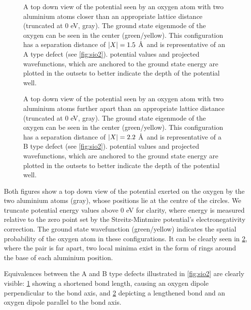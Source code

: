 \begin{figure}[htp]
\resizebox{\textwidth}{!}{}
\caption[A Type Ground State Wavefunction]{\label{fig:Atype}A top down view of the potential seen by an oxygen atom with two aluminium atoms closer than an appropriate lattice distance (truncated at $0$ eV, gray). The ground state eigenmode of the oxygen can be seen in the center (green/yellow). This configuration has a separation distance of $\lvert X\rvert = 1.5$ \AA\ and is representative of an A type defect (see \cref{fig:sio2}).  potential values and projected wavefunctions, which are anchored to the ground state energy  are plotted in the outsets to better indicate the depth of the potential well.}
\end{figure}

\begin{figure}[htp]
\resizebox{\textwidth}{!}{}
\caption[B Type Ground State Wavefunction]{\label{fig:Btype}A top down view of the potential seen by an oxygen atom with two aluminium atoms further apart than an appropriate lattice distance (truncated at $0$ eV, gray). The ground state eigenmode of the oxygen can be seen in the center (green/yellow). This configuration has a separation distance of $\lvert X\rvert = 2.2$ \AA\ and is representative of a B type defect (see \cref{fig:sio2}).   potential values and projected wavefunctions, which are anchored to the ground state energy  are plotted in the outsets to better indicate the depth of the potential well.}
\end{figure}

Both figures show a top down view of the potential exerted on the oxygen by the two aluminium atoms (gray), whose positions lie at the centre of the circles.
We truncate potential energy values above $0$ eV for clarity, where energy is measured relative to the zero point set by the Streitz-Mintmire potential's electronegativity correction. The ground state wavefunction (green/yellow) indicates the spatial probability of the oxygen atom in these configurations.
It can be clearly seen in \cref{fig:Btype}, where the pair is far apart, two local minima exist in the form of rings around the base of each aluminium position.

Equivalences between the A and B type defects illustrated in \cref{fig:sio2} are clearly visible: \cref{fig:Atype} showing a shortened bond length, causing an oxygen dipole perpendicular to the bond axis, and \cref{fig:Btype} depicting a lengthened bond and an oxygen dipole parallel to the bond axis.

